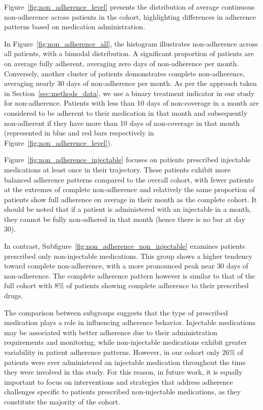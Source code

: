 Figure~\ref{fig:non_adherence_level} presents the distribution of average continuous non-adherence across patients in the cohort, highlighting differences in adherence patterns based on medication administration.

In Figure~\ref{fig:non_adherence_all}, the histogram illustrates non-adherence across all patients, with a bimodal distribution.
A significant proportion of patients are on average fully adherent, averaging zero days of non-adherence per month.
Conversely, another cluster of patients demonstrates complete non-adherence, averaging nearly 30 days of non-adherence per month.
As per the approach taken in Section~\ref{sec:methods_data}, we use a binary treatment indicator in our study for non-adherence. 
Patients with less than 10 days of non-coverage in a month are considered to be adherent to their medication in that month and subsequently non-adherent if they have more than 10 days of non-coverage in that month (represented in blue and red bars respectively in Figure~\ref{fig:non_adherence_level}).

Figure~\ref{fig:non_adherence_injectable} focuses on patients prescribed injectable medications at least once in their trajectory.
These patients exhibit more balanced adherence patterns compared to the overall cohort, with fewer patients at the extremes of complete non-adherence and relatively the same proportion of patients show full adherence on average in their month as the complete cohort.
It should be noted that if a patient is administered with an injectable in a month, they cannot be fully non-adhered in that month (hence there is no bar at day 30).

In contrast, Subfigure~\ref{fig:non_adherence_non_injectable} examines patients prescribed only non-injectable medications.
This group shows a higher tendency toward complete non-adherence, with a more pronounced peak near 30 days of non-adherence. 
The complete adherence pattern however is similar to that of the full cohort with 8\% of patients showing complete adherence to their prescribed drugs.

The comparison between subgroups suggests that the type of prescribed medication plays a role in influencing adherence behavior.
Injectable medications may be associated with better adherence due to their administration requirements and monitoring, while non-injectable medications exhibit greater variability in patient adherence patterns.
However, in our cohort only 26\% of patients were ever administered an injectable medication throughout the time they were involved in this study.
For this reason, in future work, it is equally important to focus on interventions and strategies that address adherence challenges specific to patients prescribed non-injectable medications, as they constitute the majority of the cohort.


